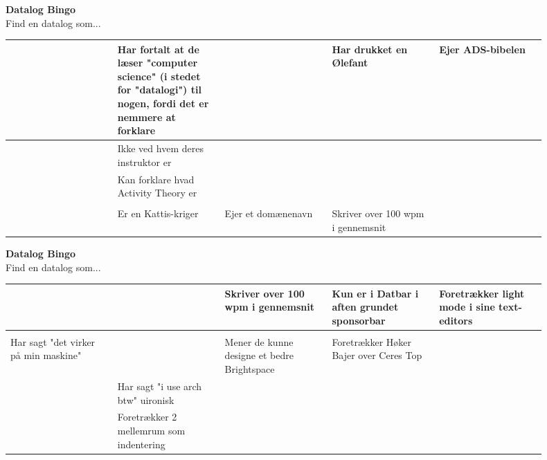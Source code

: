 \documentclass{article}
\begin{document}
\begin{center}
{\LARGE\bfseries Datalog Bingo}\\[0.5em]
{\large Find en datalog som...}\\[2em]
\begin{tabular}{|p{0.18\linewidth}|p{0.18\linewidth}|p{0.18\linewidth}|p{0.18\linewidth}|p{0.18\linewidth}|}
\hline
  & Har fortalt at de læser "computer science" (i stedet for "datalogi") til nogen, fordi det er nemmere at forklare &   & Har drukket en Ølefant & Ejer ADS-bibelen \\
\hline
  & Ikke ved hvem deres instruktor er &   &   &   \\
\hline
  & Kan forklare hvad Activity Theory er &   &   &   \\
\hline
  &   &   &   &   \\
\hline
  & Er en Kattis-kriger & Ejer et domænenavn & Skriver over 100 wpm i gennemsnit &   \\
\hline
\end{tabular}
\end{center}
\newpage

\begin{center}
{\LARGE\bfseries Datalog Bingo}\\[0.5em]
{\large Find en datalog som...}\\[2em]
\begin{tabular}{|p{0.18\linewidth}|p{0.18\linewidth}|p{0.18\linewidth}|p{0.18\linewidth}|p{0.18\linewidth}|}
\hline
  &   & Skriver over 100 wpm i gennemsnit & Kun er i Datbar i aften grundet sponsorbar & Foretrækker light mode i sine text-editors \\
\hline
  &   &   &   &   \\
\hline
Har sagt "det virker på min maskine" &   & Mener de kunne designe et bedre Brightspace & Foretrækker Høker Bajer over Ceres Top &   \\
\hline
  & Har sagt "i use arch btw" uironisk &   &   &   \\
\hline
  & Foretrækker 2 mellemrum som indentering &   &   &   \\
\hline
\end{tabular}
\end{center}
\newpage
\end{document}
